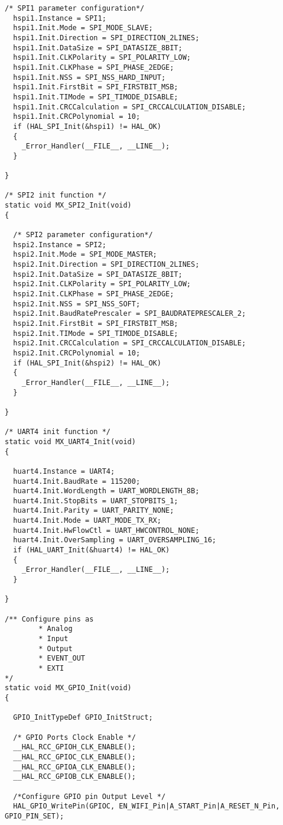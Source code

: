 \begin{lstlisting}[label=algoritmo:STM32F4:main.c,style = STM-code,frame=single,caption=STM32F4:main.c]
  /* SPI1 parameter configuration*/
  hspi1.Instance = SPI1;
  hspi1.Init.Mode = SPI_MODE_SLAVE;
  hspi1.Init.Direction = SPI_DIRECTION_2LINES;
  hspi1.Init.DataSize = SPI_DATASIZE_8BIT;
  hspi1.Init.CLKPolarity = SPI_POLARITY_LOW;
  hspi1.Init.CLKPhase = SPI_PHASE_2EDGE;
  hspi1.Init.NSS = SPI_NSS_HARD_INPUT;
  hspi1.Init.FirstBit = SPI_FIRSTBIT_MSB;
  hspi1.Init.TIMode = SPI_TIMODE_DISABLE;
  hspi1.Init.CRCCalculation = SPI_CRCCALCULATION_DISABLE;
  hspi1.Init.CRCPolynomial = 10;
  if (HAL_SPI_Init(&hspi1) != HAL_OK)
  {
    _Error_Handler(__FILE__, __LINE__);
  }

}

/* SPI2 init function */
static void MX_SPI2_Init(void)
{

  /* SPI2 parameter configuration*/
  hspi2.Instance = SPI2;
  hspi2.Init.Mode = SPI_MODE_MASTER;
  hspi2.Init.Direction = SPI_DIRECTION_2LINES;
  hspi2.Init.DataSize = SPI_DATASIZE_8BIT;
  hspi2.Init.CLKPolarity = SPI_POLARITY_LOW;
  hspi2.Init.CLKPhase = SPI_PHASE_2EDGE;
  hspi2.Init.NSS = SPI_NSS_SOFT;
  hspi2.Init.BaudRatePrescaler = SPI_BAUDRATEPRESCALER_2;
  hspi2.Init.FirstBit = SPI_FIRSTBIT_MSB;
  hspi2.Init.TIMode = SPI_TIMODE_DISABLE;
  hspi2.Init.CRCCalculation = SPI_CRCCALCULATION_DISABLE;
  hspi2.Init.CRCPolynomial = 10;
  if (HAL_SPI_Init(&hspi2) != HAL_OK)
  {
    _Error_Handler(__FILE__, __LINE__);
  }

}

/* UART4 init function */
static void MX_UART4_Init(void)
{

  huart4.Instance = UART4;
  huart4.Init.BaudRate = 115200;
  huart4.Init.WordLength = UART_WORDLENGTH_8B;
  huart4.Init.StopBits = UART_STOPBITS_1;
  huart4.Init.Parity = UART_PARITY_NONE;
  huart4.Init.Mode = UART_MODE_TX_RX;
  huart4.Init.HwFlowCtl = UART_HWCONTROL_NONE;
  huart4.Init.OverSampling = UART_OVERSAMPLING_16;
  if (HAL_UART_Init(&huart4) != HAL_OK)
  {
    _Error_Handler(__FILE__, __LINE__);
  }

}

/** Configure pins as 
        * Analog 
        * Input 
        * Output
        * EVENT_OUT
        * EXTI
*/
static void MX_GPIO_Init(void)
{

  GPIO_InitTypeDef GPIO_InitStruct;

  /* GPIO Ports Clock Enable */
  __HAL_RCC_GPIOH_CLK_ENABLE();
  __HAL_RCC_GPIOC_CLK_ENABLE();
  __HAL_RCC_GPIOA_CLK_ENABLE();
  __HAL_RCC_GPIOB_CLK_ENABLE();

  /*Configure GPIO pin Output Level */
  HAL_GPIO_WritePin(GPIOC, EN_WIFI_Pin|A_START_Pin|A_RESET_N_Pin, GPIO_PIN_SET);


\end{lstlisting}
